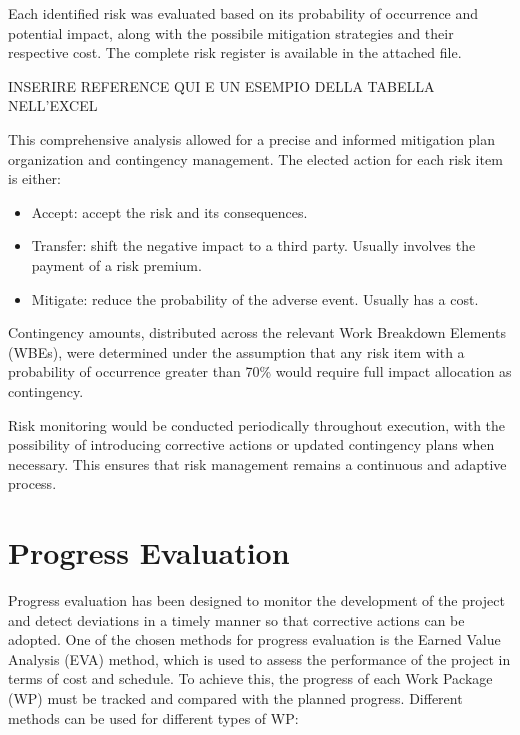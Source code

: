 Each identified risk was evaluated based on its probability of occurrence and potential impact, along with the possibile mitigation strategies and their respective cost.
The complete risk register is available in the attached file.

INSERIRE REFERENCE QUI E UN ESEMPIO DELLA TABELLA NELL'EXCEL

This comprehensive analysis allowed for a precise and informed mitigation plan organization and contingency management.
The elected action for each risk item is either:
\begin{itemize}
    \item Accept: accept the risk and its consequences.
    \item Transfer: shift the negative impact to a third party. Usually involves the payment of a risk premium.
    \item Mitigate: reduce the probability of the adverse event. Usually has a cost.
\end{itemize}

Contingency amounts, distributed across the relevant Work Breakdown Elements (WBEs), were determined under the assumption that any risk item with a probability of occurrence greater than 70\% would require full impact allocation as contingency.

Risk monitoring would be conducted periodically throughout execution, with the possibility of introducing corrective actions or updated contingency plans when necessary. This ensures that risk management remains a continuous and adaptive process.

\section{Progress Evaluation}
Progress evaluation has been designed to monitor the development of the project and detect deviations in a timely manner so that corrective actions can be adopted. One of the chosen methods for progress evaluation is the Earned Value Analysis (EVA) method, which is used to assess the performance of the project in terms of cost and schedule. To achieve this, the progress of each Work Package (WP) must be tracked and compared with the planned progress. Different methods can be used for different types of WP:

